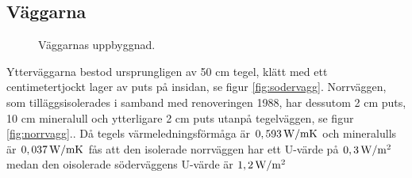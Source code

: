 \subsection{Väggarna}
\label{subsec:walls}

\begin{figure}[hpbt]
\centering
{}

\caption{\label{fig:thewalls} Väggarnas uppbyggnad.}
\end{figure}

Ytterväggarna bestod ursprungligen av 50 cm tegel, klätt med ett centimetertjockt lager av puts på insidan, se figur \ref{fig:sodervagg}. Norrväggen, som tilläggsisolerades i samband med renoveringen 1988, har dessutom 2 cm puts, 10 cm mineralull och ytterligare 2 cm puts utanpå tegelväggen, se figur \ref{fig:norrvagg}.\cite{kandidatarbete2010}\cite{petersarneo}. Då tegels värmeledningsförmåga är $\unit[0,593]{W/mK}$ och mineralulls är $\unit[0,037]{W/mK}$ fås att den isolerade norrväggen har ett U-värde på $\unit[0,3]{W/m^2}$ medan den oisolerade söderväggens U-värde är $\unit[1,2]{W/m^2}$

